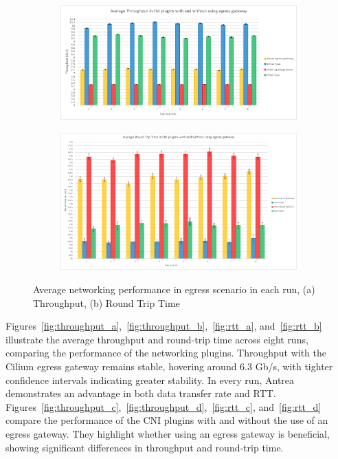 \begin{figure}[H]
    \centering
    \begin{subfigure}[b]{0.9\textwidth}
        \includegraphics[width=\textwidth]{plots/egress/throughput_all.png}
        \caption{}
        \label{fig:throughput_all}
    \end{subfigure}
    \begin{subfigure}[b]{0.9\textwidth}
        \includegraphics[width=\textwidth]{plots/egress/rtt_all.png}
        \caption{}
        \label{fig:rtt_all}
    \end{subfigure}
    
    \caption{Average networking performance in egress scenario in each run, (a) Throughput, (b) Round Trip Time}
    \label{fig:networking_avg_all}
\end{figure}




Figures~\ref{fig:throughput_a},~\ref{fig:throughput_b},~\ref{fig:rtt_a}, and~\ref{fig:rtt_b} illustrate the average throughput and round-trip time across eight runs, comparing the performance of the networking plugins. Throughput with the Cilium egress gateway remains stable, hovering around 6.3 Gb/s, with tighter confidence intervals indicating greater stability. In every run, Antrea demonstrates an advantage in both data transfer rate and RTT.
Figures~\ref{fig:throughput_c},~\ref{fig:throughput_d},~\ref{fig:rtt_c}, and~\ref{fig:rtt_d} compare the performance of the CNI plugins with and without the use of an egress gateway. They highlight whether using an egress gateway is beneficial, showing significant differences in throughput and round-trip time.


